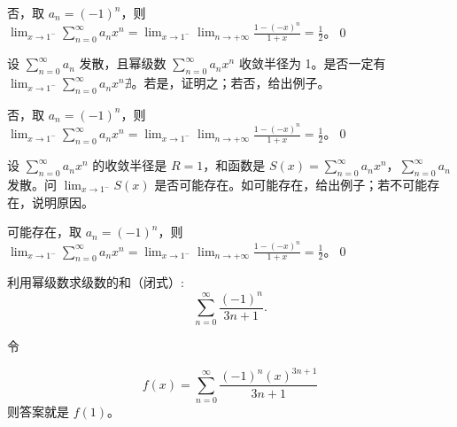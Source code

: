 否，取 $\displaystyle a_{n} =( -1)^{n}$，则 $\lim _{x\rightarrow 1^{-}}\sum _{n=0}^{\infty } a_{n} x^{n} =\lim _{x\rightarrow 1^{-}}\lim _{n\rightarrow +\infty }\frac{1-( -x)^{n}}{1+x} =\frac{1}{2}$。\qed 



\begin{ques}
设 $\sum _{n=0}^{\infty } a_{n}$ 发散，且幂级数 $\sum _{n=0}^{\infty } a_{n} x^{n}$ 收敛半径为 1。是否一定有 $\lim _{x\rightarrow 1^{-}}\sum _{n=0}^{\infty } a_{n} x^{n} \nexists $。若是，证明之；若否，给出例子。
\end{ques}



否，取 $\displaystyle a_{n} =( -1)^{n}$，则 $\lim _{x\rightarrow 1^{-}}\sum _{n=0}^{\infty } a_{n} x^{n} =\lim _{x\rightarrow 1^{-}}\lim _{n\rightarrow +\infty }\frac{1-( -x)^{n}}{1+x} =\frac{1}{2}$。\qed 



\begin{ques}
设 $\sum _{n=0}^{\infty } a_{n} x^{n}$ 的收敛半径是 $R=1$，和函数是 $S(x)=\sum _{n=0}^{\infty } a_{n} x^{n}$，$\sum _{n=0}^{\infty } a_{n}$ 发散。问 $\lim _{x\rightarrow 1^{-}} S(x)$ 是否可能存在。如可能存在，给出例子；若不可能存在，说明原因。
\end{ques}



可能存在，取 $\displaystyle a_{n} =( -1)^{n}$，则 $\lim _{x\rightarrow 1^{-}}\sum _{n=0}^{\infty } a_{n} x^{n} =\lim _{x\rightarrow 1^{-}}\lim _{n\rightarrow +\infty }\frac{1-( -x)^{n}}{1+x} =\frac{1}{2}$。\qed 





\begin{ques}
利用幂级数求级数的和（闭式）:
\begin{equation*}
	\sum _{n=0}^{\infty }\frac{(-1)^{n}}{3n+1} .
\end{equation*}
\end{ques}


令



\begin{equation*}
	f( x) =\sum _{n=0}^{\infty }\frac{(-1)^{n} (x)^{3n+1}}{3n+1}
\end{equation*}则答案就是 $\displaystyle f( 1)$。




